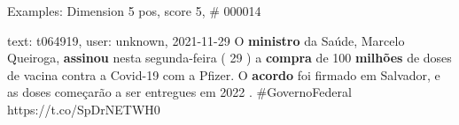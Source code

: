 \begin{frame}{Examples: Dimension 5 pos, score 5, \# 000014}
\footnotesize
\begin{exampleblock}{text: t064919, user: unknown, 2021-11-29}
O \textbf{ministro} da Saúde, Marcelo Queiroga, \textbf{assinou} nesta 
segunda-feira ( 29 ) a \textbf{compra} de 100 \textbf{milhões} de doses de 
vacina contra a Covid-19 com a Pfizer. O \textbf{acordo} foi firmado em 
Salvador, e as doses começarão a ser entregues em 2022 . \#GovernoFederal 
https://t.co/SpDrNETWH0 
\end{exampleblock}
\end{frame}
